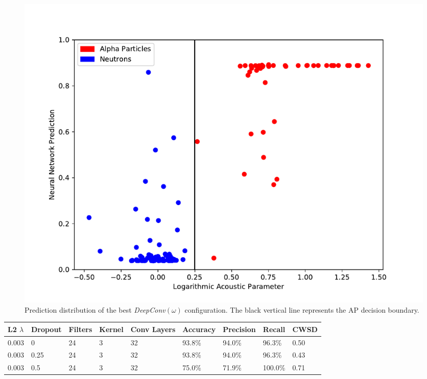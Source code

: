 \documentclass[10pt]{article}
\begin{document}
\begin{figure}[h]
    \centering
    \includegraphics[width=\textwidth]{waveform_hist}
    \caption{\label{waveform_hist} Prediction distribution of the best {\it DeepConv}$(\omega)$ configuration. The black vertical line represents the AP decision boundary.}
\end{figure}

\begin{minipage}{\textwidth}
    \begin{center}
         \label{deepconv_table} 
        \begin{tabular}{|l|l|l|l|l|l|l|l|l|}
            \hline
            L2 $\lambda$ & Dropout & Filters & Kernel & Conv Layers & Accuracy & Precision & Recall & CWSD \\
            \hline
            0.003 & 0 & 24 & 3 & 32 & 93.8\% & 94.0\% & 96.3\% & 0.50 \\
            \hline
            0.003 & 0.25 & 24 & 3 & 32 & 93.8\% & 94.0\% & 96.3\% & 0.43 \\
            \hline
            0.003 & 0.5 & 24 & 3 & 32 & 75.0\% & 71.9\% & 100.0\% & 0.71 \\
            \hline
        \end{tabular}
    \end{center}
\end{minipage}
\end{document}
